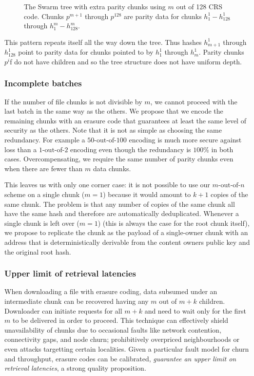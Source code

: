 \begin{figure}[htbp]
   \centering
   
   \caption[Swarm hash erasure]{The Swarm tree with extra parity chunks using $m$ out of 128 CRS code. Chunks $p^{m+1}$ through $p^{128}$ are parity data for chunks $h^1_1 - h^1_{128}$ through $h^{m}_1  - h^{m}_{128}$.}
   \label{fig:Swarm-hash-erasure}
\end{figure}


This pattern repeats itself all the way down the tree. Thus hashes $h^1_{m+1}$ through $h^1_{128}$ point to parity data for chunks pointed to by $h^1_1$ through $h^1_{m}$. Parity chunks $p^i$f do not have children and so the tree structure does not have uniform depth.

\subsubsection{Incomplete batches}

If the number of file chunks is not divisible by $m$, we cannot proceed with the last batch in the same way as the others. We propose that we encode the remaining chunks with an erasure code that guarantees at least the same level of security as the others. Note that it is not as simple as choosing the same redundancy. For example a $50\text{-out-of-}100$ encoding is much more secure against loss than a $1\text{-out-of-}2$ encoding even though the redundancy is $100\%$ in both cases. Overcompensating, we require the same number of parity chunks even when there are fewer than $m$ data chunks.

This leaves us with only one corner case: it is not possible to use our $m\text{-out-of-}n$ scheme on a single chunk ($m=1$) because it would amount to $k+1$ copies of the same chunk. The problem is that any number of copies of the same chunk all have the same hash and therefore are automatically deduplicated. Whenever a single chunk is left over ($m=1$) (this is always the case for the root chunk itself), we propose to replicate the chunk as the payload of a single-owner chunk with an address that is deterministically derivable from the content owners public key and the original root hash. 

\subsubsection{Upper limit of retrieval latencies}

When downloading a file with erasure coding, data subsumed under an intermediate chunk can be recovered having any $m$ out of $m+k$ children. Downloader can initiate requests for all $m+k$ and need to wait only for the first $m$ to be delivered in order to proceed.  
This technique can effectively shield unavailability of chunks due to occasional faults like network contention, connectivity gaps, and node churn; prohibitively overpriced neighbourhoods or even attacks targetting certain localities. Given a particular fault model for churn and throughput, erasure codes can be calibrated,
\emph{guarantee an upper limit on retrieval latencies}, a strong quality proposition.





